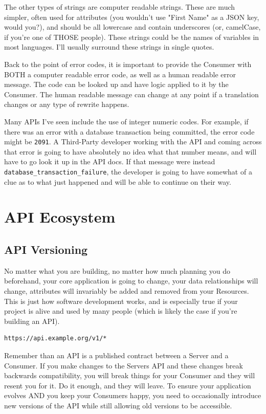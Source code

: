 \documentclass{book}
\begin{document}
The other types of strings are computer readable strings. These are much simpler, often used for attributes (you wouldn't use "First Name" as a JSON key, would you?), and should be all lowercase and contain underscores (or, camelCase, if you're one of THOSE people). These strings could be the names of variables in most languages. I'll usually surround these strings in single quotes.

Back to the point of error codes, it is important to provide the Consumer with BOTH a computer readable error code, as well as a human readable error message. The code can be looked up and have logic applied to it by the Consumer. The human readable message can change at any point if a translation changes or any type of rewrite happens.

Many APIs I've seen include the use of integer numeric codes. For example, if there was an error with a database transaction being committed, the error code might be \texttt{2091}. A Third-Party developer working with the API and coming across that error is going to have absolutely no idea what that number means, and will have to go look it up in the API docs. If that message were instead \texttt{database\_transaction\_failure}, the developer is going to have somewhat of a clue as to what just happened and will be able to continue on their way.


\chapter{API Ecosystem}

\section{API Versioning}

No matter what you are building, no matter how much planning you do beforehand, your core application is going to change, your data relationships will change, attributes will invariably be added and removed from your Resources. This is just how software development works, and is especially true if your project is alive and used by many people (which is likely the case if you're building an API).

\begin{verbatim}
https://api.example.org/v1/*
\end{verbatim}

Remember than an API is a published contract between a Server and a Consumer. If you make changes to the Servers API and these changes break backwards compatibility, you will break things for your Consumer and they will resent you for it. Do it enough, and they will leave. To ensure your application evolves AND you keep your Consumers happy, you need to occasionally introduce new versions of the API while still allowing old versions to be accessible.
\end{document}

